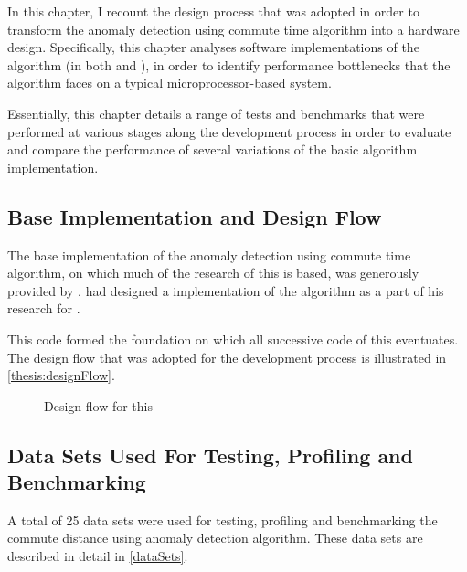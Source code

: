 In this chapter, I recount the design process that was adopted in order to
transform the anomaly detection using commute time algorithm into a hardware
design. Specifically, this chapter analyses software implementations of the
algorithm (in both  and ), in order to identify
performance bottlenecks that the algorithm faces on a typical
microprocessor-based system.

Essentially, this chapter details a range of tests and benchmarks that were
performed at various stages along the development process in order to evaluate
and compare the performance of several variations of the basic algorithm
implementation.

\subsection{Base Implementation and Design Flow}
\label{software:baseImplementation}
The base implementation of the anomaly detection using commute time algorithm,
on which much of the research of this \thesis{} is based, was generously
provided by \citeauthor{Khoa:2012}. \citeauthor{Khoa:2012} had designed a
 implementation of the algorithm as a part of his research for
 \cite{Khoa:2012}.

This  code formed the foundation on which all successive code
of this \thesis{} eventuates. The design flow that was adopted for the
development process is illustrated in \autoref{thesis:designFlow}.

\begin{figure}
    \centering
    
    \caption{Design flow for this \thesis{}}
    \label{thesis:designFlow}
\end{figure}

\subsection{Data Sets Used For Testing, Profiling and Benchmarking}
\label{software:datasets}
A total of 25 data sets were used for testing, profiling and benchmarking the
commute distance using anomaly detection algorithm. These data sets are
described in detail in \autoref{dataSets}.

